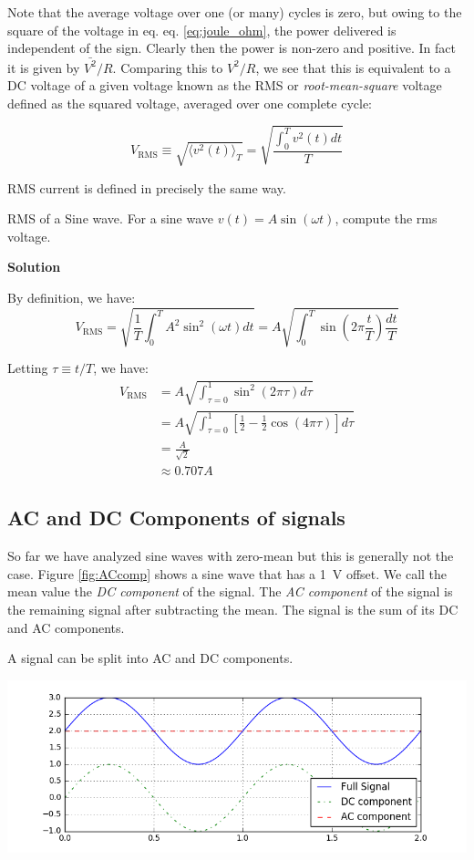 \documentclass{tufte-book}
\newcommand\Solution{\par\textbf{\textsf{Solution}}\par\medskip}
\begin{document}
Note that the average voltage over one (or many) cycles is zero, but owing to the square of the voltage in eq. eq. \ref{eq:joule_ohm}, the power delivered is independent of the sign. Clearly then the power is non-zero and positive. In fact it is given by $\bar{V^2}/R$. Comparing this to $V^2/R$, we see that this is equivalent to a DC voltage of a given voltage known as the RMS or \textit{root-mean-square} voltage defined as the squared voltage, averaged over one complete cycle:

\begin{equation}\label{def:Vrms}
V_\text{RMS}\equiv \sqrt{\langle v^2(t)\rangle_T} = \sqrt{\frac{\int_0^Tv^2(t)dt}{T}}
\end{equation}

\noindent RMS current is defined in precisely the same way.

\begin{myexample}[label = ex:rms_sine]{RMS of a Sine wave.}
For a sine wave $v(t) = A\sin(\omega t)$, compute the rms voltage.
\Solution
By definition, we have:
$$
V_\text{RMS} = \sqrt{\frac{1}{T}\int_0^TA^2\sin^2(\omega t)dt} = A\sqrt{\int_0^T\sin(2\pi\frac{t}{T}) \frac{dt}{T}}
$$

\noindent Letting $\tau\equiv t/T$, we have:
\begin{align*}
V_\text{RMS} &= A\sqrt{\int_{\tau=0}^1\sin^2 (2\pi \tau) d\tau} \\
&=  A\sqrt{\int_{\tau=0}^1\left[\frac{1}{2}-\frac{1}{2}\cos(4\pi\tau)\right]d\tau} \\
&= \frac{A}{\sqrt{2}} \\
&\approx 0.707A
\end{align*}
\end{myexample}

\subsection{AC and DC Components of signals}
So far we have analyzed sine waves with zero-mean but this is generally not the case. Figure \ref{fig:ACcomp} shows a sine wave that has a 1~V offset. We call the mean value the \textit{DC component} of the signal. The \textit{AC component} of the signal is the remaining signal after subtracting the mean. The signal is the sum of its DC and AC components. 

\begin{marginfigure}
\caption{A signal can be split into AC and DC components.}
\label{fig:ACcomp}
\includegraphics[width=\textwidth]{ACcomp}
\end{marginfigure}
\end{document}

